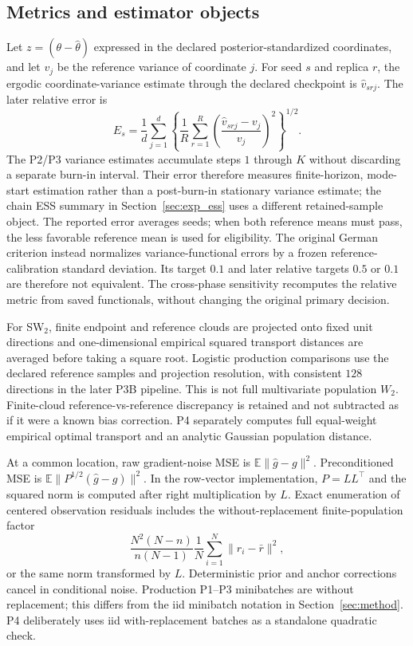 \subsection{Metrics and estimator objects}\label{app:metrics}
Let $z=(\theta-\hat\theta)$ expressed in the declared posterior-standardized coordinates, and let $v_j$ be the reference variance of coordinate $j$. For seed $s$ and replica $r$, the ergodic coordinate-variance estimate through the declared checkpoint is $\widehat v_{srj}$. The later relative error is
\begin{equation}\label{eq:exp_relative_variance}
 E_s=\frac1d\sum_{j=1}^d\left\{\frac1R\sum_{r=1}^R
 \left(\frac{\widehat v_{srj}-v_j}{v_j}\right)^2\right\}^{1/2}.
\end{equation}
The P2/P3 variance estimates accumulate steps $1$ through $K$ without discarding a separate burn-in interval. Their error therefore measures finite-horizon, mode-start estimation rather than a post-burn-in stationary variance estimate; the chain ESS summary in Section~\ref{sec:exp_ess} uses a different retained-sample object. The reported error averages seeds; when both reference means must pass, the less favorable reference mean is used for eligibility. The original German criterion instead normalizes variance-functional errors by a frozen reference-calibration standard deviation. Its target $0.1$ and later relative targets $0.5$ or $0.1$ are therefore not equivalent. The cross-phase sensitivity recomputes the relative metric from saved functionals, without changing the original primary decision.

For SW$_2$, finite endpoint and reference clouds are projected onto fixed unit directions and one-dimensional empirical squared transport distances are averaged before taking a square root. Logistic production comparisons use the declared reference samples and projection resolution, with consistent $128$ directions in the later P3B pipeline. This is not full multivariate population $W_2$. Finite-cloud reference-vs-reference discrepancy is retained and not subtracted as if it were a known bias correction. P4 separately computes full equal-weight empirical optimal transport and an analytic Gaussian population distance.

At a common location, raw gradient-noise MSE is $\mathbb E\|\widehat g-g\|^2$. Preconditioned MSE is $\mathbb E\|P^{1/2}(\widehat g-g)\|^2$. In the row-vector implementation, $P=LL^\top$ and the squared norm is computed after right multiplication by $L$. Exact enumeration of centered observation residuals includes the without-replacement finite-population factor
\begin{equation}\label{eq:exp_finite_population}
 \frac{N^2(N-n)}{n(N-1)}\frac1N\sum_{i=1}^N
 \|r_i-\bar r\|^2,
\end{equation}
or the same norm transformed by $L$. Deterministic prior and anchor corrections cancel in conditional noise. Production P1--P3 minibatches are without replacement; this differs from the iid minibatch notation in Section~\ref{sec:method}. P4 deliberately uses iid with-replacement batches as a standalone quadratic check.

